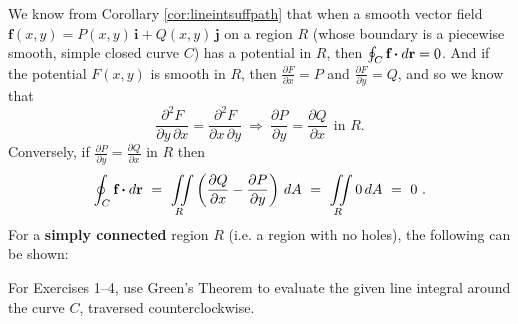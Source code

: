We know from Corollary \ref{cor:lineintsuffpath} that when a smooth vector field
$\textbf{f}(x,y) = P(x,y)\,\textbf{i} + Q(x,y)\,\textbf{j}$ on a region $R$ (whose boundary is a piecewise smooth,
simple closed curve $C$) has a potential in $R$, then $\oint_{C} \textbf{f} \bm{\cdot} d\textbf{r} = 0$. And if the potential
$F(x,y)$ is smooth in $R$, then
$\frac{\partial F}{\partial x} = P$ and $\frac{\partial F}{\partial y} = Q$, and so we know that
\begin{displaymath}
 \frac{\partial^2 F}{\partial y \,\partial x} = \frac{\partial^2 F}{\partial x \,\partial y} ~\Rightarrow~
 \frac{\partial P}{\partial y} = \frac{\partial Q}{\partial x} ~~\text{in $R$.}
\end{displaymath}
Conversely, if $\frac{\partial P}{\partial y} = \frac{\partial Q}{\partial x}$ in $R$ then
\begin{displaymath}
 \oint_{C} \textbf{f} \bm{\cdot} d\textbf{r} ~=~ \iint\limits_{R} \left( \frac{\partial Q}{\partial x} -
   \frac{\partial P}{\partial y} \right)\,dA ~=~ \iint\limits_{R} 0\,dA ~=~ 0 ~.
\end{displaymath}
For a \textbf{simply connected} region $R$ (i.e. a region with no holes), the following can be
shown:\vspace{3mm}
\newpage
\centerline{}\label{sec4dot3}
\par\noindent For Exercises 1--4, use Green's Theorem to evaluate the given line integral around the curve $C$, traversed
counterclockwise.
